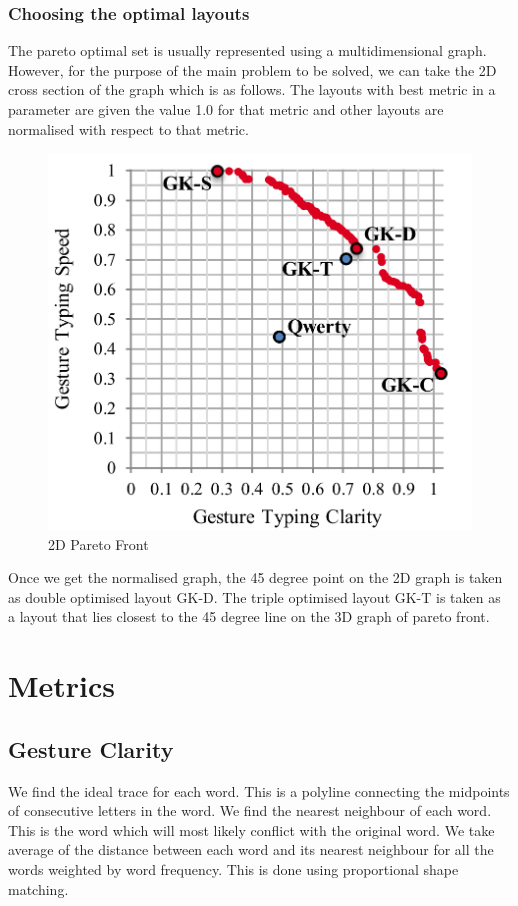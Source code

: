 \documentclass[MTech]{iitmdiss}
\begin{document}
\newpage
\subsection{Choosing the optimal layouts}
The pareto optimal set is usually represented using a multidimensional graph. However, for the purpose of the main problem to be solved, we can take the 2D cross section of the graph which is as follows. The layouts with best metric in a parameter are given the value 1.0 for that metric and other layouts are normalised with respect to that metric.


\begin{figure}[h!]
	\centering
	\includegraphics[scale=0.5]{Images/svc}
	\caption{2D Pareto Front}
\end{figure}


Once we get the normalised graph, the 45 degree point on the 2D graph is taken as double optimised layout GK-D.
The triple optimised layout GK-T is taken as a layout that lies closest to the 45 degree line on the 3D graph of pareto front.

\chapter{Metrics}
\section{Gesture Clarity}
We find the ideal trace for each word. This is a polyline connecting the midpoints of consecutive letters in the word. We find the nearest neighbour of each word. This is the word which will most likely conflict with the original word. We take average of the distance between each word and its nearest neighbour for all the words weighted by word frequency. This is done using proportional shape matching.
\end{document}
